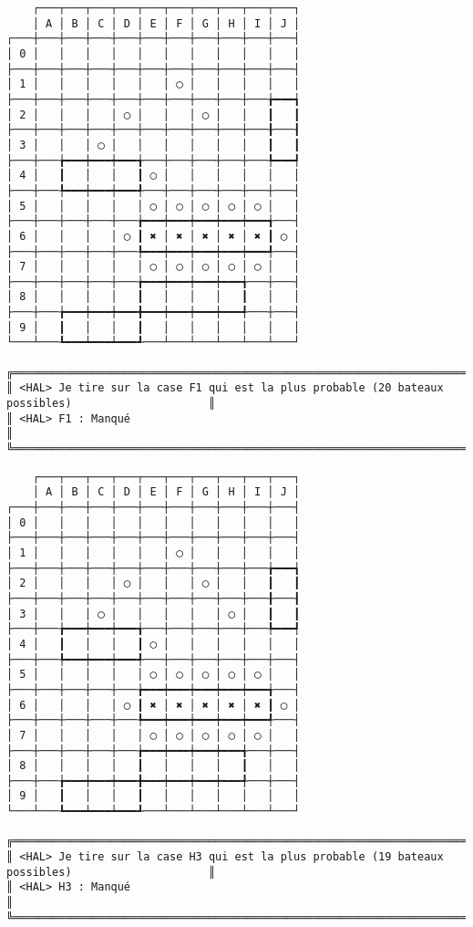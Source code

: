 {\scriptsize
\begin{verbatim}
    ┌───┬───┬───┬───┬───┬───┬───┬───┬───┬───┐
    │ A │ B │ C │ D │ E │ F │ G │ H │ I │ J │
┌───┼───┼───┼───┼───┼───┼───┼───┼───┼───┼───┤
│ 0 │   │   │   │   │   │   │   │   │   │   │
├───┼───┼───┼───┼───┼───┼───┼───┼───┼───┼───┤
│ 1 │   │   │   │   │   │ ◯ │   │   │   │   │
├───┼───┼───┼───┼───┼───┼───┼───┼───┼───╆━━━┪
│ 2 │   │   │   │ ◯ │   │   │ ◯ │   │   ┃   ┃
├───┼───┼───┼───┼───┼───┼───┼───┼───┼───╂───┨
│ 3 │   │   │ ◯ │   │   │   │   │   │   ┃   ┃
├───┼───╆━━━┿━━━┿━━━╅───┼───┼───┼───┼───╄━━━┩
│ 4 │   ┃   │   │   ┃ ◯ │   │   │   │   │   │
├───┼───╄━━━┿━━━┿━━━╃───┼───┼───┼───┼───┼───┤
│ 5 │   │   │   │   │ ◯ │ ◯ │ ◯ │ ◯ │ ◯ │   │
├───┼───┼───┼───┼───╆━━━┿━━━┿━━━┿━━━┿━━━╅───┤
│ 6 │   │   │   │ ◯ ┃ ✖ │ ✖ │ ✖ │ ✖ │ ✖ ┃ ◯ │
├───┼───┼───┼───┼───╄━━━┿━━━┿━━━┿━━━┿━━━╃───┤
│ 7 │   │   │   │   │ ◯ │ ◯ │ ◯ │ ◯ │ ◯ │   │
├───┼───┼───┼───┼───╆━━━┿━━━┿━━━┿━━━╅───┼───┤
│ 8 │   │   │   │   ┃   │   │   │   ┃   │   │
├───┼───╆━━━┿━━━┿━━━╋━━━┿━━━┿━━━┿━━━╃───┼───┤
│ 9 │   ┃   │   │   ┃   │   │   │   │   │   │
└───┴───┺━━━┷━━━┷━━━┹───┴───┴───┴───┴───┴───┘

╔══════════════════════════════════════════════════════════════════════════════════════════════════╗
║ <HAL> Je tire sur la case F1 qui est la plus probable (20 bateaux possibles)                     ║
║ <HAL> F1 : Manqué                                                                                ║
╚══════════════════════════════════════════════════════════════════════════════════════════════════╝
\end{verbatim}}
\newpage

{\scriptsize
\begin{verbatim}
    ┌───┬───┬───┬───┬───┬───┬───┬───┬───┬───┐
    │ A │ B │ C │ D │ E │ F │ G │ H │ I │ J │
┌───┼───┼───┼───┼───┼───┼───┼───┼───┼───┼───┤
│ 0 │   │   │   │   │   │   │   │   │   │   │
├───┼───┼───┼───┼───┼───┼───┼───┼───┼───┼───┤
│ 1 │   │   │   │   │   │ ◯ │   │   │   │   │
├───┼───┼───┼───┼───┼───┼───┼───┼───┼───╆━━━┪
│ 2 │   │   │   │ ◯ │   │   │ ◯ │   │   ┃   ┃
├───┼───┼───┼───┼───┼───┼───┼───┼───┼───╂───┨
│ 3 │   │   │ ◯ │   │   │   │   │ ◯ │   ┃   ┃
├───┼───╆━━━┿━━━┿━━━╅───┼───┼───┼───┼───╄━━━┩
│ 4 │   ┃   │   │   ┃ ◯ │   │   │   │   │   │
├───┼───╄━━━┿━━━┿━━━╃───┼───┼───┼───┼───┼───┤
│ 5 │   │   │   │   │ ◯ │ ◯ │ ◯ │ ◯ │ ◯ │   │
├───┼───┼───┼───┼───╆━━━┿━━━┿━━━┿━━━┿━━━╅───┤
│ 6 │   │   │   │ ◯ ┃ ✖ │ ✖ │ ✖ │ ✖ │ ✖ ┃ ◯ │
├───┼───┼───┼───┼───╄━━━┿━━━┿━━━┿━━━┿━━━╃───┤
│ 7 │   │   │   │   │ ◯ │ ◯ │ ◯ │ ◯ │ ◯ │   │
├───┼───┼───┼───┼───╆━━━┿━━━┿━━━┿━━━╅───┼───┤
│ 8 │   │   │   │   ┃   │   │   │   ┃   │   │
├───┼───╆━━━┿━━━┿━━━╋━━━┿━━━┿━━━┿━━━╃───┼───┤
│ 9 │   ┃   │   │   ┃   │   │   │   │   │   │
└───┴───┺━━━┷━━━┷━━━┹───┴───┴───┴───┴───┴───┘

╔══════════════════════════════════════════════════════════════════════════════════════════════════╗
║ <HAL> Je tire sur la case H3 qui est la plus probable (19 bateaux possibles)                     ║
║ <HAL> H3 : Manqué                                                                                ║
╚══════════════════════════════════════════════════════════════════════════════════════════════════╝
\end{verbatim}}
\newpage

